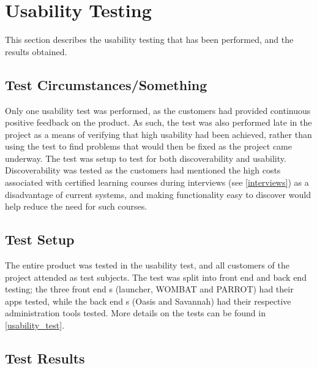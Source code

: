\section{Usability Testing}
This section describes the usability testing that has been performed, and the results obtained. 

\subsection{Test Circumstances/Something}
Only one usability test was performed, as the customers had provided continuous positive feedback on the product. 
As such, the test was also performed late in the project as a means of verifying that high usability had been achieved, rather than using the test to find problems that would then be fixed as the project came underway. \newline
The test was setup to test for both discoverability and usability. 
Discoverability was tested as the customers had mentioned the high costs associated with certified learning courses during interviews (see \autoref{interviews}) as a disadvantage of current systems, and making functionality easy to discover would help reduce the need for such courses.

\subsection{Test Setup}
The entire \giraf[] product was tested in the usability test, and all customers of the project attended as test subjects. 
The test was split into front end and back end testing; the three front end \localgroup[]s (launcher, WOMBAT and PARROT) had their apps tested, while the back end \localgroup[]s (Oasis and Savannah) had their respective administration tools tested. 
More details on the tests can be found in \autoref{usability_test}.

\subsection{Test Results}
